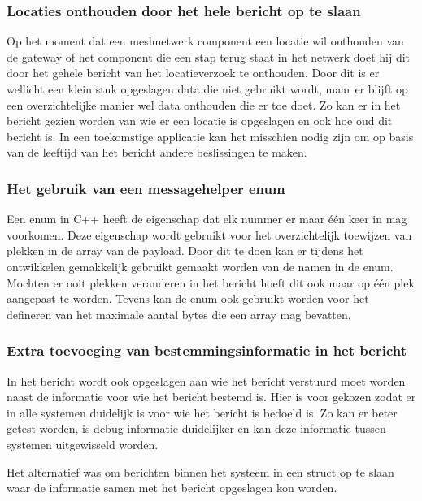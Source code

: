 \documentclass[a4paper, 11pt, oneside]{report}
\begin{document}
\subsubsection{Locaties onthouden door het hele bericht op te slaan}

Op het moment dat een meshnetwerk component een locatie wil onthouden van de gateway of het component die een stap terug staat in het netwerk doet hij dit door het gehele bericht van het locatieverzoek te onthouden.
Door dit is er wellicht een klein stuk opgeslagen data die niet gebruikt wordt, maar er blijft op een overzichtelijke manier wel data onthouden die er toe doet. 
Zo kan er in het bericht gezien worden van wie er een locatie is opgeslagen en ook hoe oud dit bericht is.
In een toekomstige applicatie kan het misschien nodig zijn om op basis van de leeftijd van het bericht andere beslissingen te maken.  

\subsubsection{Het gebruik van een messagehelper enum}

Een enum in C++ heeft de eigenschap dat elk nummer er maar één keer in mag voorkomen. 
Deze eigenschap wordt gebruikt voor het overzichtelijk toewijzen van plekken in de array van de payload. 
Door dit te doen kan er tijdens het ontwikkelen gemakkelijk gebruikt gemaakt worden van de namen in de enum.
Mochten er ooit plekken veranderen in het bericht hoeft dit ook maar op één plek aangepast te worden.
Tevens kan de enum ook gebruikt worden voor het defineren van het maximale aantal bytes die een array mag bevatten. 

\subsubsection{Extra toevoeging van bestemmingsinformatie in het bericht}
In het bericht wordt ook opgeslagen aan wie het bericht verstuurd moet worden naast de informatie voor wie het bericht bestemd is.
Hier is voor gekozen zodat er in alle systemen duidelijk is voor wie het bericht is bedoeld is.
Zo kan er beter getest worden, is debug informatie duidelijker en kan deze informatie tussen systemen uitgewisseld worden.

Het alternatief was om berichten binnen het systeem in een struct op te slaan waar de informatie samen met het bericht opgeslagen kon worden.

\end{document}
